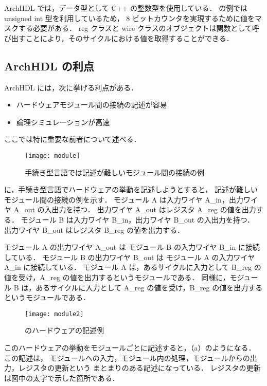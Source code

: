 ArchHDL では，データ型として C++ の整数型を使用している．
の例では unsigned int 型を利用しているため，
8 ビットカウンタを実現するために値をマスクする必要がある．
reg クラスと wire クラスのオブジェクトは関数として呼び出すことにより，そのサイクルにおける値を取得することができる．


\subsection{ArchHDL の利点}

ArchHDL には，次に挙げる利点がある．

\begin{itemize}
 \item ハードウェアモジュール間の接続の記述が容易
 \item 論理シミュレーションが高速
\end{itemize}
ここでは特に重要な前者について述べる．

\begin{figure}[t]
 \centering
 \texttt{[image: module]}
 \caption{手続き型言語では記述が難しいモジュール間の接続の例}
 \label{fig:module}
\end{figure}

 に，手続き型言語でハードウェアの挙動を記述しようとすると，
記述が難しいモジュール間の接続の例を示す．
モジュール A は入力ワイヤ A\_in，出力ワイヤ A\_out の入出力を持つ．
出力ワイヤ A\_out はレジスタ A\_reg の値を出力する．
モジュール B は入力ワイヤ B\_in，出力ワイヤ B\_out の入出力を持つ．
出力ワイヤ B\_out はレジスタ B\_reg の値を出力する．

モジュール A の出力ワイヤ A\_out は モジュール B の入力ワイヤ B\_in に接続している．
モジュール B の出力ワイヤ B\_out は モジュール A の入力ワイヤ A\_in に接続している．
モジュール A は，あるサイクルに入力として B\_reg の値を受け，A\_reg の値を出力するというモジュールである．
同様に，モジュール B は，あるサイクルに入力として A\_reg の値を受け，B\_reg の値を出力するというモジュールである．

\begin{figure}[t]
 \begin{center}
  \texttt{[image: module2]}
  \caption{ のハードウェアの記述例}
  \label{fig:module2}
 \end{center}
\end{figure}

このハードウェアの挙動をモジュールごとに記述すると，（a）のようになる．
この記述は，
モジュールへの入力，モジュール内の処理，モジュールからの出力，レジスタの更新という
まとまりのある記述になっている．
レジスタの更新は図中の太字で示した箇所である．

